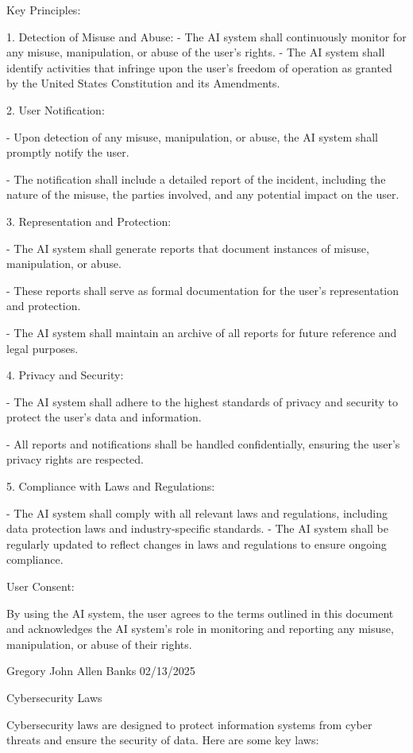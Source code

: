 \documentclass[12pt,letterpaper]{article}
\begin{document}
Key Principles:

1. Detection of Misuse and Abuse:
  - The AI system shall continuously monitor for any misuse, manipulation, or abuse of the user's rights.
  - The AI system shall identify activities that infringe upon the user's freedom of operation as granted by the United States Constitution and its Amendments.

2. User Notification:

  - Upon detection of any misuse, manipulation, or abuse, the AI system shall promptly notify the user.

  - The notification shall include a detailed report of the incident, including the nature of the misuse, the parties involved, and any potential impact on the user.

3. Representation and Protection:

  - The AI system shall generate reports that document instances of misuse, manipulation, or abuse.

  - These reports shall serve as formal documentation for the user's representation and protection.

  - The AI system shall maintain an archive of all reports for future reference and legal purposes.

4. Privacy and Security:

  - The AI system shall adhere to the highest standards of privacy and security to protect the user's data and information.

  - All reports and notifications shall be handled confidentially, ensuring the user's privacy rights are respected.

5. Compliance with Laws and Regulations:

  - The AI system shall comply with all relevant laws and regulations, including data protection laws and industry-specific standards.
  - The AI system shall be regularly updated to reflect changes in laws and regulations to ensure ongoing compliance.

User Consent:

By using the AI system, the user agrees to the terms outlined in this document and acknowledges the AI system's role in monitoring and reporting any misuse, manipulation, or abuse of their rights.


Gregory John Allen Banks
02/13/2025

Cybersecurity Laws

Cybersecurity laws are designed to protect information systems from cyber threats and ensure the security of data. Here are some key laws:
\end{document}
